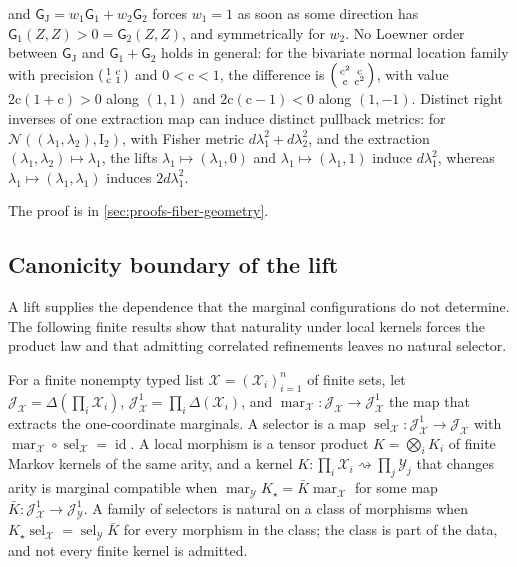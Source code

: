 and $\mathsf G_{\mathrm J}=w_1\mathsf G_1+w_2\mathsf G_2$ forces $w_1=1$ as soon as some
direction has $\mathsf G_1(Z,Z)>0=\mathsf G_2(Z,Z)$, and symmetrically for $w_2$.  No
Loewner order between $\mathsf G_{\mathrm J}$ and $\mathsf G_1+\mathsf G_2$ holds in
general: for the bivariate normal location family with precision
$\begin{psmallmatrix}1&\mathrm c\\\mathrm c&1\end{psmallmatrix}$ and $0<\mathrm c<1$, the
difference is
$\begin{psmallmatrix}\mathrm c^2&\mathrm c\\\mathrm c&\mathrm c^2\end{psmallmatrix}$, with
value $2\mathrm c(1+\mathrm c)>0$ along $(1,1)$ and $2\mathrm c(\mathrm c-1)<0$ along
$(1,-1)$.  Distinct right inverses of one extraction map can induce distinct pullback
metrics: for $\mathcal N((\lambda_1,\lambda_2),\mathrm I_2)$, with Fisher metric
$d\lambda_1^2+d\lambda_2^2$, and the extraction $(\lambda_1,\lambda_2)\mapsto\lambda_1$,
the lifts $\lambda_1\mapsto(\lambda_1,0)$ and $\lambda_1\mapsto(\lambda_1,1)$ induce
$d\lambda_1^2$, whereas $\lambda_1\mapsto(\lambda_1,\lambda_1)$ induces $2d\lambda_1^2$.

The proof is in \cref{sec:proofs-fiber-geometry}.

\subsection{Canonicity boundary of the lift}
\label{sec:hist-canonical-dependence-selection}

A lift supplies the dependence that the marginal configurations do not determine.  The
following finite results show that naturality under local kernels forces the product
law and that admitting correlated refinements leaves no natural selector.

For a finite nonempty typed list $\mathcal X=(\mathcal X_i)_{i=1}^n$ of finite sets, let
$\mathcal J_{\mathcal X}=\Delta(\prod_i\mathcal X_i)$,
$\mathcal J^1_{\mathcal X}=\prod_i\Delta(\mathcal X_i)$, and
$\operatorname{mar}_{\mathcal X}:\mathcal J_{\mathcal X}\to\mathcal J^1_{\mathcal X}$ the
map that extracts the one-coordinate marginals.  A selector is a map
$\operatorname{sel}_{\mathcal X}:\mathcal J^1_{\mathcal X}\to\mathcal J_{\mathcal X}$ with
$\operatorname{mar}_{\mathcal X}\circ\operatorname{sel}_{\mathcal X}=\operatorname{id}$.
A local morphism is a tensor product $K=\bigotimes_iK_i$ of finite Markov kernels of the
same arity, and a kernel $K:\prod_i\mathcal X_i\rightsquigarrow\prod_j\mathcal Y_j$ that
changes arity is marginal compatible when
$\operatorname{mar}_{\mathcal Y}K_\star=\bar K\operatorname{mar}_{\mathcal X}$ for some
map $\bar K:\mathcal J^1_{\mathcal X}\to\mathcal J^1_{\mathcal Y}$.  A family of
selectors is natural on a class of morphisms when
$K_\star\operatorname{sel}_{\mathcal X}=\operatorname{sel}_{\mathcal Y}\bar K$ for every
morphism in the class; the class is part of the data, and not every finite kernel is
admitted.

